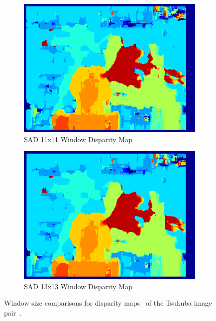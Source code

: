 \begin{figure}
\begin{center}
\begin{subfigure}{0.45\textwidth}
		\includegraphics[width=\textwidth]{figures/sad_tsukuba_11x11_0-15.png}
		\caption{SAD 11x11 Window Disparity Map}
		\label{fig:tsukuba11x11}
	\end{subfigure}
	\begin{subfigure}{0.45\textwidth}
		\includegraphics[width=\textwidth]{figures/sad_tsukuba_13x13_0-15.png}
		\caption{SAD 13x13 Window Disparity Map}
		\label{fig:tsukuba13x13}
	\end{subfigure}
	\captionfonts
	\caption{Window size comparisons for disparity maps~\cite{matlab} of the Tsukuba image pair~\cite{middlebury}.}
	\label{fig:tsukubaWinSize}
\end{center}
\end{figure}

